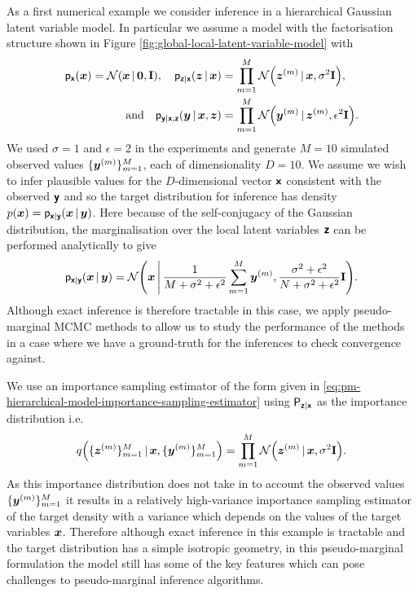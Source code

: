 As a first numerical example we consider inference in a hierarchical Gaussian latent variable model. In particular we assume a model with the factorisation structure shown in Figure \ref{fig:global-local-latent-variable-model} with
\begin{equation}
\begin{split}
\pden{\rvct{x}}(\vct{x}) = \nrm{\vct{x}\gvn\vct{0},\mathbf{I}},
\quad
\pden{\rvct{z}|\rvct{x}}(\vct{z}\gvn\vct{x}) &= \prod_{m=1}^M \nrm{\vct{z}^{(m)}\gvn\vct{x},\sigma^2\mathbf{I}},\\
\quad\textrm{and}\quad
\pden{\rvct{y}|\rvct{x},\rvct{z}}(\vct{y}\gvn\vct{x},\vct{z}) &= \prod_{m=1}^M \nrm{\vct{y}^{(m)}\gvn\vct{z}^{(m)},\epsilon^2\mathbf{I}}.
\end{split}
\end{equation}
We used $\sigma=1$ and $\epsilon=2$ in the experiments and generate $M=10$ simulated observed values $\lbrace \boldsymbol{y}^{(m)}\rbrace_{m=1}^M$, each of dimensionality $D=10$. We assume we wish to infer plausible values for the $D$-dimensional vector $\boldsymbol{\mathsf{x}}$ consistent with the observed $\boldsymbol{\mathsf{y}}$ and so the target distribution for inference has density $p(\boldsymbol{x}) = \mathsf{p}_{\boldsymbol{\mathsf{x}}|\boldsymbol{\mathsf{y}}}(\boldsymbol{x}\operatorname{|}\boldsymbol{y})$. Here because of the self-conjugacy of the Gaussian distribution, the marginalisation over the local latent variables $\boldsymbol{\mathsf{z}}$ can be performed analytically to give
\begin{equation}\label{eq:gaussian-latent-model-analytic-posterior}
  \pden{\rvct{x}|\rvct{y}}(\vct{x}\gvn\vct{y}) =
  \nrm{\vct{x} \,\middle|\, \frac{1}{M + \sigma^2 + \epsilon^2} \sum_{m=1}^M \vct{y}^{(m)}, \frac{\sigma^2+\epsilon^2}{N + \sigma^2 + \epsilon^2} \mathbf{I}}.
\end{equation}
Although exact inference is therefore tractable in this case, we apply pseudo-marginal \ac{MCMC} methods to allow us to study the performance of the methods in a case where we have a ground-truth for the inferences to check convergence against.

We use an importance sampling estimator of the form given in \eqref{eq:pm-hierarchical-model-importance-sampling-estimator} using $\mathsf{P}_{\boldsymbol{\mathsf{z}}|\boldsymbol{\mathsf{x}}}$ as the importance distribution  i.e.
\begin{equation}
  q\lpa\lbrace \vct{z}^{(m)} \rbrace_{m=1}^M \gvn \vct{x}, \lbrace \vct{y}^{(m)} \rbrace_{m=1}^M\rpa 
  = \prod_{m=1}^M \nrm{\vct{z}^{(m)} \gvn \vct{x}, \sigma^2 \mathbf{I}}.
\end{equation}
As this importance distribution does not take in to account the observed values $\lbrace \boldsymbol{y}^{(m)}\rbrace_{m=1}^M$ it results in a relatively high-variance importance sampling estimator of the target density with a variance which depends on the values of the target variables $\boldsymbol{x}$. Therefore although exact inference in this example is tractable and the target distribution has a simple isotropic geometry, in this pseudo-marginal formulation the model still has some of the key features which can pose challenges to pseudo-marginal inference algorithms.

